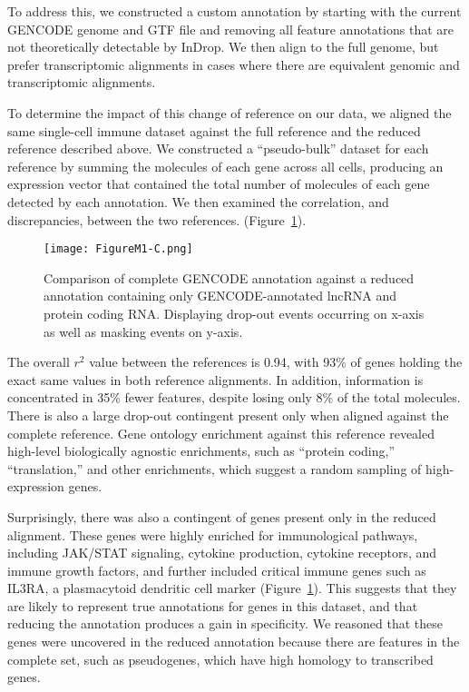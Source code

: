 To address this, we constructed a custom annotation by starting with the current GENCODE genome and GTF file and removing all feature annotations that are not theoretically detectable by InDrop.
We then align to the full genome, but prefer transcriptomic alignments in cases where there are equivalent genomic and transcriptomic alignments.

To determine the impact of this change of reference on our data, we aligned the same single-cell immune dataset against the full reference and the reduced reference described above. 
We constructed a ``pseudo-bulk'' dataset for each reference by summing the molecules of each gene across all cells, producing an expression vector that contained the total number of molecules of each gene detected by each annotation. 
We then examined the correlation, and discrepancies, between the two references.
(Figure~\ref{fig:m1c}).

\begin{figure}
\centering
\texttt{[image: FigureM1-C.png]}
\caption{Comparison of complete GENCODE annotation against a reduced annotation containing only GENCODE-annotated lncRNA and protein coding RNA\@. Displaying drop-out events occurring on x-axis as well as masking events on y-axis.}
\label{fig:m1c}
\end{figure}

The overall $r^{2}$ value between the references is 0.94, with 93\% of genes holding the exact same values in both reference alignments. 
In addition, information is concentrated in 35\% fewer features, despite losing only 8\% of the total molecules. 
There is also a large drop-out contingent present only when aligned against the complete reference. 
Gene ontology enrichment against this reference revealed high-level biologically agnostic enrichments, such as ``protein coding,'' ``translation,'' and other enrichments, which suggest a random sampling of high-expression genes.

Surprisingly, there was also a contingent of genes present only in the reduced alignment. 
These genes were highly enriched for immunological pathways, including JAK/STAT signaling, cytokine production, cytokine receptors, and immune growth factors, and further included critical immune genes such as IL3RA, a plasmacytoid dendritic cell marker (Figure~\ref{fig:m1c}).  
This suggests that they are likely to represent true annotations for genes in this dataset, and that reducing the annotation produces a gain in specificity. 
We reasoned that these genes were uncovered in the reduced annotation because there are features in the complete set, such as pseudogenes, which have high homology to transcribed genes. 

